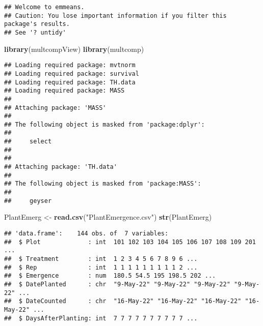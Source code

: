 \documentclass[
  12pt,
]{article}
\newenvironment{Shaded}{\begin{snugshade}}{\end{snugshade}}
\newcommand{\CommentTok}[1]{\textcolor[rgb]{0.56,0.35,0.01}{\textit{#1}}}
\newcommand{\FunctionTok}[1]{\textcolor[rgb]{0.13,0.29,0.53}{\textbf{#1}}}
\newcommand{\NormalTok}[1]{#1}
\newcommand{\OtherTok}[1]{\textcolor[rgb]{0.56,0.35,0.01}{#1}}
\newcommand{\SpecialCharTok}[1]{\textcolor[rgb]{0.81,0.36,0.00}{\textbf{#1}}}
\newcommand{\StringTok}[1]{\textcolor[rgb]{0.31,0.60,0.02}{#1}}
\begin{document}
\begin{verbatim}
## Welcome to emmeans.
## Caution: You lose important information if you filter this package's results.
## See '? untidy'
\end{verbatim}

\begin{Shaded}
\begin{Highlighting}[]
\FunctionTok{library}\NormalTok{(multcompView)}
\FunctionTok{library}\NormalTok{(multcomp)}
\end{Highlighting}
\end{Shaded}

\begin{verbatim}
## Loading required package: mvtnorm
## Loading required package: survival
## Loading required package: TH.data
## Loading required package: MASS
## 
## Attaching package: 'MASS'
## 
## The following object is masked from 'package:dplyr':
## 
##     select
## 
## 
## Attaching package: 'TH.data'
## 
## The following object is masked from 'package:MASS':
## 
##     geyser
\end{verbatim}

\begin{Shaded}
\begin{Highlighting}[]
\NormalTok{PlantEmerg }\OtherTok{\textless{}{-}} \FunctionTok{read.csv}\NormalTok{(}\StringTok{"PlantEmergence.csv"}\NormalTok{)}
\FunctionTok{str}\NormalTok{(PlantEmerg)}
\end{Highlighting}
\end{Shaded}

\begin{verbatim}
## 'data.frame':    144 obs. of  7 variables:
##  $ Plot             : int  101 102 103 104 105 106 107 108 109 201 ...
##  $ Treatment        : int  1 2 3 4 5 6 7 8 9 6 ...
##  $ Rep              : int  1 1 1 1 1 1 1 1 1 2 ...
##  $ Emergence        : num  180.5 54.5 195 198.5 202 ...
##  $ DatePlanted      : chr  "9-May-22" "9-May-22" "9-May-22" "9-May-22" ...
##  $ DateCounted      : chr  "16-May-22" "16-May-22" "16-May-22" "16-May-22" ...
##  $ DaysAfterPlanting: int  7 7 7 7 7 7 7 7 7 7 ...
\end{verbatim}

\begin{Shaded}
\end{Shaded}
\end{document}
